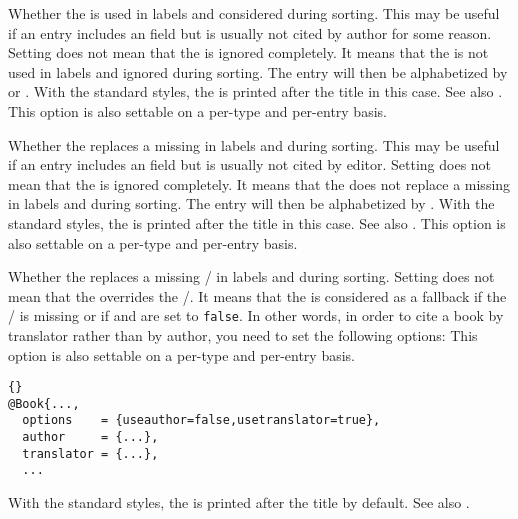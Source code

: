 \documentclass{ltxdockit}[2011/03/25]
\begin{document}
\begin{optionlist}


Whether the  is used in labels and considered during sorting. This may be useful if an entry includes an  field but is usually not cited by author for some reason. Setting  does not mean that the  is ignored completely. It means that the  is not used in labels and ignored during sorting. The entry will then be alphabetized by  or . With the standard styles, the  is printed after the title in this case. See also .
This option is also settable on a per-type and per-entry basis.


Whether the  replaces a missing  in labels and during sorting. This may be useful if an entry includes an  field but is usually not cited by editor. Setting  does not mean that the  is ignored completely. It means that the  does not replace a missing  in labels and during sorting. The entry will then be alphabetized by . With the standard styles, the  is printed after the title in this case. See also .
This option is also settable on a per-type and per-entry basis.


Whether the  replaces a missing \slash {} in labels and during sorting. Setting  does not mean that the  overrides the \slash {}. It means that the  is considered as a fallback if the \slash {} is missing or if  and  are set to \texttt{false}. In other words, in order to cite a book by translator rather than by author, you need to set the following options:
This option is also settable on a per-type and per-entry basis.

\begin{lstlisting}[style=bibtex]{}
@Book{...,
  options    = {useauthor=false,usetranslator=true},
  author     = {...},
  translator = {...},
  ...
\end{lstlisting}
%
With the standard styles, the  is printed after the title by default. See also .


\end{optionlist}
\end{document}
